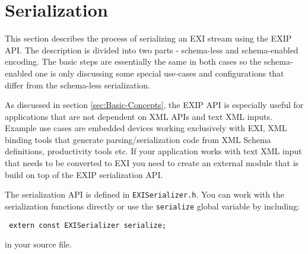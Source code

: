 \section{Serialization}
\label{sec:Serialization}

This section describes the process of serializing an EXI stream using the EXIP API.
The description is divided into two parts - schema-less and schema-enabled encoding.
The basic steps are essentially the same in both cases so the schema-enabled one is only
discussing some special use-cases and configurations that differ from the schema-less
serialization. 

As discussed in section \ref{sec:Basic-Concepts}, the EXIP API is especially useful
for applications that are not dependent on XML APIs and text XML inputs. Example
use cases are embedded devices working exclusively with EXI, XML binding tools
that generate parsing/serialization code from XML Schema definitions, productivity tools
etc. If your application works with text XML input that needs to be converted to EXI
you need to create an external module that is build on top of the EXIP serialization API.

The serialization API is defined in \texttt{EXISerializer.h}. You can work with the
serialization functions directly or use the \texttt{serialize} global variable by including:
\begin{lstlisting}
 extern const EXISerializer serialize;
\end{lstlisting}
in your source file.
 
